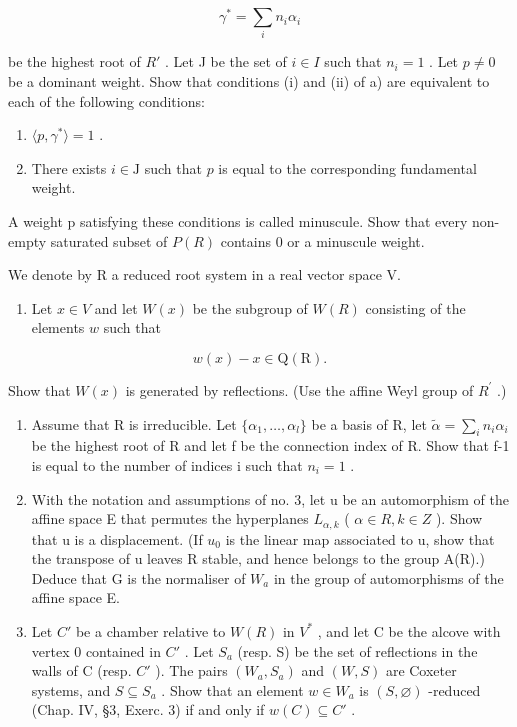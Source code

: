 \[
\gamma^ {*} = \sum_ {i} n _ {i} \alpha_ {i}
\]

be the highest root of \(R'\) . Let J be the set of \(i \in I\) such that \(n_{i} = 1\) . Let \(p \neq 0\) be a dominant weight. Show that conditions (i) and (ii) of a) are equivalent to each of the following conditions:

\begin{enumerate}
\def\labelenumi{(\roman{enumi})}
\setcounter{enumi}{2}
\item
  \(\langle p, \gamma^{*} \rangle = 1\) .
\item
  There exists \(i \in \mathrm{J}\) such that \(p\) is equal to the corresponding fundamental weight.
\end{enumerate}

A weight p satisfying these conditions is called minuscule. Show that every non-empty saturated subset of \(P(R)\) contains 0 or a minuscule weight.


We denote by R a reduced root system in a real vector space V.

\begin{enumerate}
\def\labelenumi{\arabic{enumi})}
\tightlist
\item
  Let \(x \in V\) and let \(W(x)\) be the subgroup of \(W(R)\) consisting of the elements \(w\) such that
\end{enumerate}

\[
w (x) - x \in \mathrm{Q} (\mathrm{R}).
\]

Show that \(W(x)\) is generated by reflections. (Use the affine Weyl group of \(R^{\prime}\) .)

\begin{enumerate}
\def\labelenumi{\arabic{enumi})}
\setcounter{enumi}{1}
\item
  Assume that R is irreducible. Let \(\{\alpha_{1},\ldots,\alpha_{l}\}\) be a basis of R, let \(\tilde{\alpha}=\sum_{i}n_{i}\alpha_{i}\) be the highest root of R and let f be the connection index of R. Show that f-1 is equal to the number of indices i such that \(n_{i}=1\) .
\item
  With the notation and assumptions of no. 3, let u be an automorphism of the affine space E that permutes the hyperplanes \(L_{\alpha,k}\) ( \(\alpha \in R, k \in Z\) ). Show that u is a displacement. (If \(u_{0}\) is the linear map associated to u, show that the transpose of u leaves R stable, and hence belongs to the group A(R).) Deduce that G is the normaliser of \(W_{a}\) in the group of automorphisms of the affine space E.
\item
  Let \(C'\) be a chamber relative to \(W(R)\) in \(V^{*}\) , and let C be the alcove with vertex 0 contained in \(C'\) . Let \(S_{a}\) (resp. S) be the set of reflections in the walls of C (resp. \(C'\) ). The pairs \((W_{a}, S_{a})\) and \((W, S)\) are Coxeter systems, and \(S \subseteq S_{a}\) . Show that an element \(w \in W_{a}\) is \((S, \varnothing)\) -reduced (Chap. IV, §3, Exerc. 3) if and only if \(w(C) \subseteq C'\) .
\end{enumerate}

